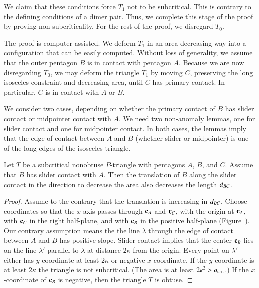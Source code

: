 We claim that these conditions force $T_1$ not to be subcritical.
This is contrary to the defining conditions of a dimer pair.  Thus, we
complete this stage of the proof by proving non-subcriticality. For
the rest of the proof, we disregard $T_0$.

The proof is computer assisted.  We deform $T_1$ in an area decreasing
way into a configuration that can be easily computed.  Without loss of
generality, we assume that the outer pentagon $B$ is in contact with
pentagon $A$.  Because we are now disregarding $T_0$, we may deform the
triangle $T_1$ by moving $C$, preserving the long isosceles constraint
and decreasing area, until $C$ has primary contact.  In particular,
$C$ is in contact with $A$ or $B$.

We consider two cases, depending on whether the primary contact of $B$
has slider contact or midpointer contact with $A$.  We need two
non-anomaly lemmas, one for slider contact and one for midpointer
contact.  In both cases, the lemmas imply that the edge of contact
between $A$ and $B$ (whether slider or midpointer) is one of the long
edges of the isosceles triangle.

\begin{lemma}  
  Let $T$ be a subcritical nonobtuse $P$-triangle with pentagons $A$,
  $B$, and $C$.  Assume that $B$ has slider contact with $A$.  Then
  the translation of $B$ along the slider contact in the direction to
  decrease the area also decreases the length $d_{BC}$.
\end{lemma}

\begin{proof} 
  Assume to the contrary that the translation is increasing in
  $d_{BC}$.  Choose coordinates so that the $x$-axis passes through
  ${\mathbf c}_A$ and ${\mathbf c}_C$, with the origin at ${\mathbf c}_A$, with ${\mathbf c}_C$ in the
  right half-plane, and with ${\mathbf c}_B$ in the positive half-plane
  (Figure~).  Our contrary assumption means the the
  line $\lambda$ through the edge of contact between $A$ and $B$ has
  positive slope.  Slider contact implies that the center ${\mathbf c}_B$ lies
  on the line $\lambda'$ parallel to $\lambda$ at distance $2\kappa$
  from the origin.  Every point on $\lambda'$ either has
  $y$-coordinate at least $2\kappa$ or negative $x$-coordinate.  If
  the $y$-coordinate is at least $2\kappa$ the triangle is not
  subcritical.  (The area is at least $2\kappa^2>a_\text{crit}$.) If the
  $x$-coordinate of ${\mathbf c}_B$ is negative, then the triangle $T$ is
  obtuse.
\end{proof}

